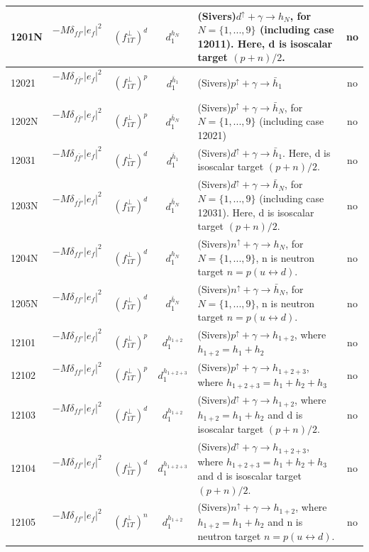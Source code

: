 \documentclass[prd,nofootinbib,eqsecnum,final]{revtex4}
\renewcommand{\(}{\left(}
\renewcommand{\)}{\right)}
\renewcommand{\[}{\left[}
\renewcommand{\]}{\right]}
\begin{document}
\begin{center}
\begin{longtable}{||l|p{6cm}|c|c||p{7cm}|c||}
\\\hline
1201N & $-M\delta_{ff'}|e_f|^2$~~&$(f_{1T}^\perp)^{d}$ & $d^{h_N}_1$ & (Sivers)$d^{\uparrow}+\gamma\to h_N$, for $N=\{1,...,9\}$ (including case 12011). Here, d is isoscalar target $(p+n)/2$. & no
\\\hline \hline
12021 & $-M\delta_{f\bar f'}|e_f|^2$~~&$(f_{1T}^\perp)^p$ & $d^{\bar h_1}_1$ & (Sivers)$p^{\uparrow}+\gamma\to \bar h_1$ & no
\\\hline
1202N & $-M\delta_{f\bar f'}|e_f|^2$~~&$(f_{1T}^\perp)^p$ & $d^{\bar h_N}_1$ & (Sivers)$p^{\uparrow}+\gamma\to \bar h_N$, for $N=\{1,...,9\}$ (including case 12021) & no
\\\hline \hline
12031 & $-M\delta_{f\bar f'}|e_f|^2$~~&$(f_{1T}^\perp)^{d}$ & $d^{\bar h_1}_1$ & (Sivers)$d^{\uparrow}+\gamma\to \bar h_1$. Here, d is isoscalar target $(p+n)/2$. & no
\\\hline
1203N & $-M\delta_{f\bar f'}|e_f|^2$~~&$(f_{1T}^\perp)^{d}$ & $d^{\bar h_N}_1$ & (Sivers)$d^{\uparrow}+\gamma\to \bar h_N$, for $N=\{1,...,9\}$ (including case 12031). Here, d is isoscalar target $(p+n)/2$. & no
\\\hline\hline
1204N & $-M\delta_{ff'}|e_f|^2$~~&$(f_{1T}^\perp)^d$ & $d^{h_N}_1$ & (Sivers)$n^{\uparrow}+\gamma\to h_N$, for $N=\{1,...,9\}$, n is neutron target $n=p(u\leftrightarrow d)$. & no
\\\hline
1205N & $-M\delta_{ff'}|e_f|^2$~~&$(f_{1T}^\perp)^d$ & $d^{\bar h_N}_1$ & (Sivers)$n^{\uparrow}+\gamma\to \bar h_N$, for $N=\{1,...,9\}$, n is neutron target $n=p(u\leftrightarrow d)$. & no
\\\hline \hline
12101 & $-M\delta_{ff'}|e_f|^2$~~&$(f_{1T}^\perp)^{p}$ & $d^{h_{1+2}}_1$ & (Sivers)$p^{\uparrow}+\gamma\to h_{1+2}$, where $h_{1+2}=h_1+h_2$ & no
\\\hline
12102 & $-M\delta_{ff'}|e_f|^2$~~&$(f_{1T}^\perp)^{p}$ & $d^{h_{1+2+3}}_1$ & (Sivers)$p^{\uparrow}+\gamma\to h_{1+2+3}$, where $h_{1+2+3}=h_1+h_2+h_3$ & no
\\\hline
12103 & $-M\delta_{ff'}|e_f|^2$~~&$(f_{1T}^\perp)^{d}$ & $d^{h_{1+2}}_1$ & (Sivers)$d^{\uparrow}+\gamma\to h_{1+2}$, where $h_{1+2}=h_1+h_2$ and d is isoscalar target $(p+n)/2$. & no
\\\hline
12104 & $-M\delta_{ff'}|e_f|^2$~~&$(f_{1T}^\perp)^{d}$ & $d^{h_{1+2+3}}_1$ & (Sivers)$d^{\uparrow}+\gamma\to h_{1+2+3}$, where $h_{1+2+3}=h_1+h_2+h_3$ and d is isoscalar target $(p+n)/2$. & no
\\\hline
12105 & $-M\delta_{ff'}|e_f|^2$~~&$(f_{1T}^\perp)^{n}$ & $d^{h_{1+2}}_1$ & (Sivers)$n^{\uparrow}+\gamma\to h_{1+2}$, where $h_{1+2}=h_1+h_2$ and n is neutron target $n=p(u\leftrightarrow d)$. & no

\end{longtable}
\end{center}
\end{document}
